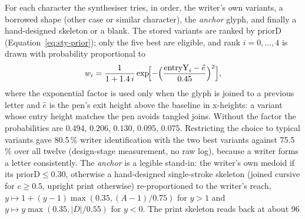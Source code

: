 For each character the synthesiser tries, in order, the writer's own variants, a borrowed shape (other case or similar character), the \emph{anchor} glyph, and finally a hand-designed skeleton or a blank.
The stored variants are ranked by $\mathrm{priorD}$ (Equation~\ref{eq:sty-prior}); only the five best are eligible, and rank $i=0,\ldots,4$ is drawn with probability proportional to
\begin{equation}
w_i=\frac{1}{1+1.4\,i}\exp\!\Bigl[-\Bigl(\frac{\mathrm{entryY}_i-\hat e}{0.45}\Bigr)^2\Bigr],
\label{eq:syn-pick}
\end{equation}
where the exponential factor is used only when the glyph is joined to a previous letter and $\hat e$ is the pen's exit height above the baseline in x-heights: a variant whose entry height matches the pen avoids tangled joins.
Without the factor the probabilities are $0.494$, $0.206$, $0.130$, $0.095$, $0.075$.
Restricting the choice to typical variants gave 80.5\,\% writer identification with the two best variants against 75.5\,\% over all twelve (design-stage measurement, no raw log), because a writer forms a letter consistently.
The \emph{anchor} is a legible stand-in: the writer's own medoid if its $\mathrm{priorD}\le0.30$, otherwise a hand-designed single-stroke skeleton (joined cursive for $c\ge0.5$, upright print otherwise) re-proportioned to the writer's reach, $y\mapsto1+(y-1)\max(0.35,(A-1)/0.75)$ for $y>1$ and $y\mapsto y\max(0.35,|D|/0.55)$ for $y<0$.
The print skeleton reads back at about 96\\%

